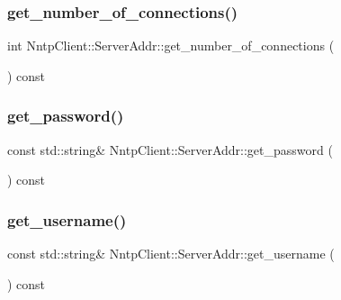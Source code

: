 \subsubsection{\texorpdfstring{get\+\_\+number\+\_\+of\+\_\+connections()}{get\_number\_of\_connections()}}
{\footnotesize\ttfamily int Nntp\+Client\+::\+Server\+Addr\+::get\+\_\+number\+\_\+of\+\_\+connections (\begin{DoxyParamCaption}{ }\end{DoxyParamCaption}) const\hspace{0.3cm}{\ttfamily [inline]}}

\hypertarget{class_nntp_client_1_1_server_addr_a675d9c66531b33bdb92e639befc30440}{}\label{class_nntp_client_1_1_server_addr_a675d9c66531b33bdb92e639befc30440} 
\subsubsection{\texorpdfstring{get\+\_\+password()}{get\_password()}}
{\footnotesize\ttfamily const std\+::string\& Nntp\+Client\+::\+Server\+Addr\+::get\+\_\+password (\begin{DoxyParamCaption}{ }\end{DoxyParamCaption}) const\hspace{0.3cm}{\ttfamily [inline]}}

\hypertarget{class_nntp_client_1_1_server_addr_a17dd214bd1236635549fa371535d9374}{}\label{class_nntp_client_1_1_server_addr_a17dd214bd1236635549fa371535d9374} 
\subsubsection{\texorpdfstring{get\+\_\+username()}{get\_username()}}
{\footnotesize\ttfamily const std\+::string\& Nntp\+Client\+::\+Server\+Addr\+::get\+\_\+username (\begin{DoxyParamCaption}{ }\end{DoxyParamCaption}) const\hspace{0.3cm}{\ttfamily [inline]}}

\hypertarget{class_nntp_client_1_1_server_addr_aa6be5e421585f72c84f4ee0daff39319}{}\label{class_nntp_client_1_1_server_addr_aa6be5e421585f72c84f4ee0daff39319} 
